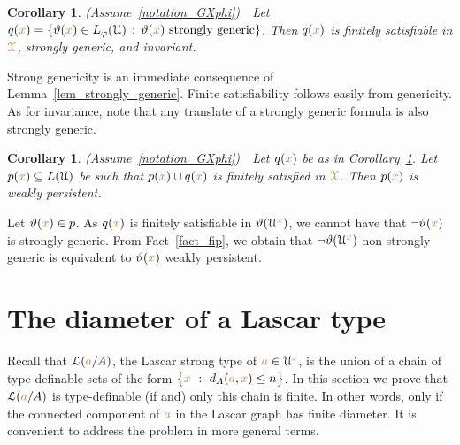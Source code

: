 \documentclass[10pt,openany]{amsproc}
\makeatletter
\def\X{\EuScript X}
\def\U{\EuScript U}
\def\Ll{\EuScript L}
\def\theta{\vartheta}
\def\phi{\varphi}
\newcounter{thm}
\theoremstyle{mio}
\newtheorem{corollary}[thm]{Corollary}\tcolorboxenvironment{corollary}{mythm}
\providecommand{\proofNameStyle}{\bfseries}
\renewenvironment{proof}[1][\proofname]{\par
  \pushQED{\qed}%
  \normalfont%
  \trivlist
  \item[\hskip\labelsep
        \proofNameStyle
    #1\@addpunct{.}]\ignorespaces
}{%
  \popQED\endtrivlist\@endpefalse
}
\def\mr{\color{brown}}
\def\mrX{{\mr\X}}
\makeatother
\begin{document}
\begin{corollary}\label{corol_str_gen}
  (Assume~\ref{notation_GXphi})\ \  
  Let $q({\mr x})=\{\theta({\mr x})\in L_\phi(\U)\,:\, \theta({\mr x})\textrm{ strongly generic}\}$.
  Then $q({\mr x})$ is finitely satisfiable in $\mrX$, strongly generic, and invariant.
\end{corollary}

\begin{proof}
  Strong genericity is an immediate consequence of Lemma~\ref{lem_strongly_generic}.
  Finite satisfiability follows easily from genericity.
  As for invariance, note that any translate of a strongly generic formula is also strongly generic.
\end{proof}

\begin{corollary}\label{corol_q_w_pers}
  (Assume~\ref{notation_GXphi})\ \  
  Let $q({\mr x})$ be as in Corollary~\ref{corol_str_gen}.
  Let $p({\mr x})\subseteq L(\U)$ be such that $p({\mr x})\cup q({\mr x})$ is finitely satisfied in $\mrX$.
  Then $p({\mr x})$ is weakly persistent.
\end{corollary}

\begin{proof}
  Let $\theta({\mr x})\in p$.
  As $q({\mr x})$ is finitely satisfiable in $\theta(\U^{\mr x})$, we cannot have that $\neg\theta({\mr x})$ is strongly generic.
  From Fact~\ref{fact_fip}, we obtain that $\neg\theta(\U^{\mr x})$ non strongly generic is equivalent to $\theta({\mr x})$ weakly persistent.
\end{proof}



\section{The diameter of a Lascar type}\label{newelski}

Recall that $\Ll({\mr a}/A)$, the Lascar strong type of ${\mr a}\in\U^{\mr x}$, is the union of a chain of type-definable sets of the form $\big\{{\mr x}\ :\ d_A({\mr a},{\mr x})\le n\big\}$.
In this section we prove that $\Ll({\mr a}/A)$ is type-definable (if and) only this chain is finite.
In other words, only if the connected component of ${\mr a}$ in the Lascar graph has finite diameter.
It is convenient to address the problem in more general terms.
\end{document}
